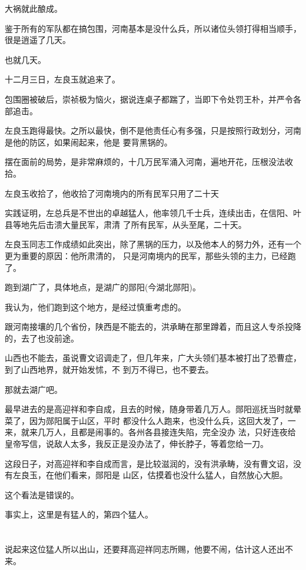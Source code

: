 \documentclass[11pt,a4paper,onecolumn]{article}
\begin{document}
大祸就此酿成。

鉴于所有的军队都在搞包围，河南基本是没什么兵，所以诸位头领打得相当顺手，很是逍遥了几天。

也就几天。

十二月三日，左良玉就追来了。

包围圈被破后，崇祯极为恼火，据说连桌子都踹了，当即下令处罚王朴，并严令各部追击。

左良玉跑得最快。之所以最快，倒不是他责任心有多强，只是按照行政划分，河南是他的防区，如果闹起来，他是
要背黑锅的。

摆在面前的局势，是非常麻烦的，十几万民军涌入河南，遍地开花，压根没法收拾。

左良玉收拾了，他收拾了河南境内的所有民军\myrule 只用了二十天

实践证明，左总兵是不世出的卓越猛人，他率领几千士兵，连续出击，在信阳、叶县等地先后击溃大量民军，肃清
了所有民军，从头至尾，二十天。

左良玉同志工作成绩如此突出，除了黑锅的压力，以及他本人的努力外，还有一个更为重要的原因：他所肃清的，
只是河南境内的民军，那些头领的主力，已经跑了。

跑到湖广了，具体地点，是湖广的郧阳(今湖北郧阳)。

我认为，他们跑到这个地方，是经过慎重考虑的。

跟河南接壤的几个省份，陕西是不能去的，洪承畴在那里蹲着，而且这人专杀投降的，去了也没前途。

山西也不能去，虽说曹文诏调走了，但几年来，广大头领们基本被打出了恐曹症，到了山西地界，就开始发怵，不
到万不得已，也不要去。

那就去湖广吧。

最早进去的是高迎祥和李自成，且去的时候，随身带着几万人。郧阳巡抚当时就晕菜了，因为郧阳属于山区，平时
都没什么人跑来，也没什么兵，这回大发了，一来，就来几万人，且都是闹事的。各州各县接连失陷，完全没办
法，只好连夜给皇帝写信，说敌人太多，我反正是没办法了，伸长脖子，等着您给一刀。

这段日子，对高迎祥和李自成而言，是比较滋润的，没有洪承畴，没有曹文诏，没有左良玉，在他们看来，郧阳是
山区，估摸着也没什么猛人，自然放心大胆。

这个看法是错误的。

事实上，这里是有猛人的，第四个猛人。

\section[\thesection]{}

说起来这位猛人所以出山，还要拜高迎祥同志所赐，他要不闹，估计这人还出不来。
\end{document}
